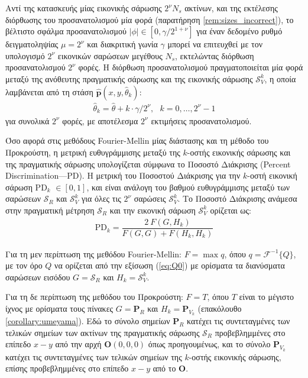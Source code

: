 Αντί της κατασκευής μίας εικονικής σάρωσης $2^\nu N_s$ ακτίνων, και της
εκτέλεσης διόρθωσης του προσανατολισμού μία φορά (παρατήρηση
\ref{rem:sizes_incorrect}), το βέλτιστο σφάλμα προσανατολισμού $|\phi| \in
[0,\gamma / 2^{1+\nu}]$ για έναν δεδομένο ρυθμό δειγματοληψίας $\mu = 2^\nu$
και διακριτική γωνία $\gamma$ μπορεί να επιτευχθεί με τον υπολογισμό
$2^\nu$ εικονικών σαρώσεων μεγέθους $N_s$, εκτελώντας διόρθωση προσανατολισμού
$2^\nu$ φορές. Η διόρθωση προσανατολισμού πραγματοποιείται μία φορά μεταξύ της
ανόθευτης πραγματικής σάρωσης και της εικονικής σάρωσης $\mathcal{S}_V^k$, η
οποία λαμβάνεται από τη στάση $\hat{\bm{p}}(x,y,\hat{\theta}_k)$:
\begin{align}
  \hat{\theta}_k = \hat{\theta} + k \cdot \gamma / 2^\nu, \ \ \ k = 0,\dots,2^\nu-1 \label{eq:theta_k_theseus}
\end{align}
για συνολικά $2^\nu$ φορές, με αποτέλεσμα $2^\nu$ εκτιμήσεις προσανατολισμού.

Όσο αφορά στις μεθόδους Fourier-Mellin μίας διάστασης και τη μέθοδο του
Προκρούστη, η μετρική ευθυγράμμισης μεταξύ της $k$-οστής εικονικής σάρωσης και
της πραγματικής σάρωσης υπολογίζεται σύμφωνα το Ποσοστό Διάκρισης (Percent
Discrimination---PD). Η μετρική του Ποσοστού Διάκρισης για την $k$-οστή
εικονική σάρωση PD$_k$ $\in [0,1]$, και είναι ανάλογη του βαθμού ευθυγράμμισης
μεταξύ των σαρώσεων $\mathcal{S}_R$ και $\mathcal{S}_V^k$ για όλες τις $2^\nu$
σαρώσεις $\mathcal{S}_V^k$. Το Ποσοστό Διάκρισης ανάμεσα στην πραγματική
μέτρηση $\mathcal{S}_R$ και την εικονική σάρωση $\mathcal{S}_V^k$ ορίζεται ως:
\begin{align}
  \text{PD}_k = \dfrac{2 \ F(G,H_k)}{F(G,G) + F(H_k,H_k)} \label{eq:pd}
\end{align}

Για τη μεν περίπτωση της μεθόδου Fourier-Mellin: $F = \max q$, όπου
$q = \mathcal{F}^{-1}\{Q\}$, με τον όρο $Q$ να ορίζεται από την εξίσωση
(\ref{eq:Q0}) με ορίσματα τα διανύσματα σαρώσεων εισόδου $G = \mathcal{S}_R$
και $H_k = \mathcal{S}_V^k$.

Για τη δε περίπτωση της μεθόδου του Προκρούστη: $F = T$, όπου $T$ είναι το
μέγιστο ίχνος με ορίσματα τους πίνακες $G = \bm{P}_R$ και $H_k = \bm{P}_{V_k}$
(επακόλουθο \ref{corollary:umeyama}). Εδώ το σύνολο σημείων $\bm{P}_R$ κατέχει
τις συντεταγμένες των τελικών σημείων των ακτίνων της πραγματικής σάρωσης
$\mathcal{S}_R$ προβεβλημμένες στο επίπεδο $x-y$ από την αρχή $\bm{O}(0,0,0)$
όπως προηγουμένως, και το σύνολο $\bm{P}_{V_k}$ κατέχει τις συντεταγμένες των
τελικών σημείων της $k$-οστής εικονικής σάρωσης, επίσης προβεβλημμένες στο
επίπεδο $x-y$ από το $\bm{O}$.

